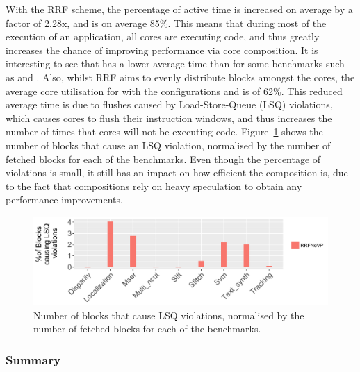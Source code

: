 With the RRF scheme, the percentage of active time is increased on average by a factor of 2.28x, and is on average 85\%.
This means that during most of the execution of an application, all cores are executing code, and thus greatly increases the chance of improving performance via core composition.
It is interesting to see that \nfvp{} has a lower average time than \nfnovp{} for some benchmarks such as  and .
Also, whilst RRF aims to evenly distribute blocks amongst the cores, the average core utilisation for  with the configurations \nfnovp{} and \nfvp{} is of 62\%.
This reduced average time is due to flushes caused by Load-Store-Queue (LSQ) violations, which causes cores to flush their instruction windows, and thus increases the number of times that cores will not be executing code.
Figure~\ref{fig:lsqvio} shows the number of blocks that cause an LSQ violation, normalised by the number of fetched blocks for each of the benchmarks.
Even though the percentage of violations is small, it still has an impact on how efficient the composition is, due to the fact that compositions rely on heavy speculation to obtain any performance improvements.
\begin{figure}[t]
    \centering
    \includegraphics[width=1\textwidth]{chapter3/graphics/lsqViol4.pdf}
    \caption{Number of blocks that cause LSQ violations, normalised by the number of fetched blocks for each of the benchmarks.}
    \label{fig:lsqvio}
	\vspace{1em}
\end{figure}



\subsubsection{Summary}

